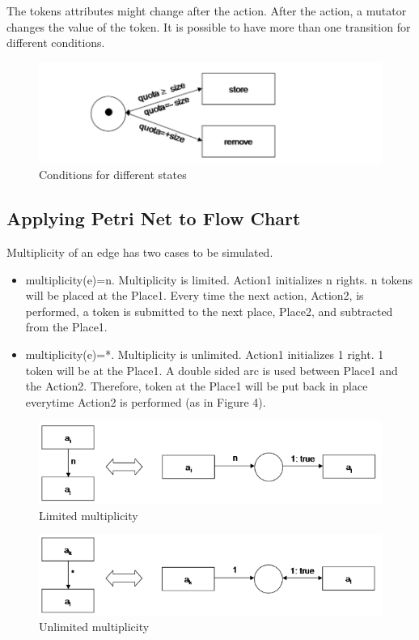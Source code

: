 \documentclass[11pt]{article} %
\begin{document}
The tokens attributes might change after the action. After the action, a mutator changes the value of the token. It is possible to have more than one transition for different conditions.

\begin{figure}[h!]
\includegraphics[width=\textwidth]{petri3}
\caption{Conditions for different states}
\end{figure}


\subsection{Applying Petri Net to Flow Chart}

Multiplicity of an edge has two cases to be simulated.

\begin{itemize}
\item multiplicity(e)=n. Multiplicity is limited. Action1 initializes n rights. n tokens will be placed at the Place1. Every time the next action, Action2, is performed, a token is submitted to the next place, Place2, and subtracted from the Place1.
\item  multiplicity(e)=*. Multiplicity is unlimited. Action1 initializes 1 right. 1 token will be at the Place1. A double sided arc is used between Place1 and the Action2. Therefore, token at the Place1 will be put back in place everytime Action2 is performed (as in Figure 4).
\end{itemize}

\begin{figure}[h!]
\includegraphics[width=\textwidth]{multip1}
\caption{Limited multiplicity}
\end{figure}

\begin{figure}[h!]
\includegraphics[width=\textwidth]{multip2}
\caption{Unlimited multiplicity}
\end{figure}
\end{document}
